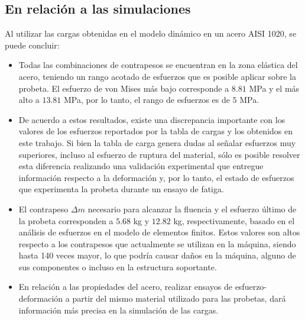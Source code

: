 \subsection{En relación a las simulaciones}
Al utilizar las cargas obtenidas en el modelo dinámico en un acero AISI 1020, se puede concluir:
\begin{itemize}
	\item Todas las combinaciones de contrapesos se encuentran en la zona elástica del acero, teniendo un rango acotado de esfuerzos que es posible aplicar sobre la probeta. El esfuerzo de von Mises más bajo corresponde a $8.81$ MPa y el más alto a $13.81$ MPa, por lo tanto, el rango de esfuerzos es de $5$ MPa. 
	\item De acuerdo a estos resultados, existe una discrepancia importante con los valores de los esfuerzos reportados por la tabla de cargas y los obtenidos en este trabajo. Si bien la tabla de carga genera dudas al señalar esfuerzos muy superiores, incluso al esfuerzo de ruptura del material, sólo es posible resolver esta diferencia realizando una validación experimental que entregue información respecto a la deformación y, por lo tanto, el estado de esfuerzos que experimenta la probeta durante un ensayo de fatiga. 
	\item El contrapeso $\Delta m$ necesario para alcanzar la fluencia y el esfuerzo último de la probeta corresponden a $5.68$ kg y $12.82$ kg, respectivamente, basado en el análisis de esfuerzos en el modelo de elementos finitos. Estos valores son altos respecto a los contrapesos que actualmente se utilizan en la máquina, siendo hasta 140 veces mayor, lo que podría causar daños en la máquina, alguno de sus componentes o incluso en la estructura soportante.
	\item En relación a las propiedades del acero, realizar ensayos de esfuerzo-deformación a partir del mismo material utilizado para las probetas, dará información más precisa en la simulación de las cargas.
\end{itemize}


